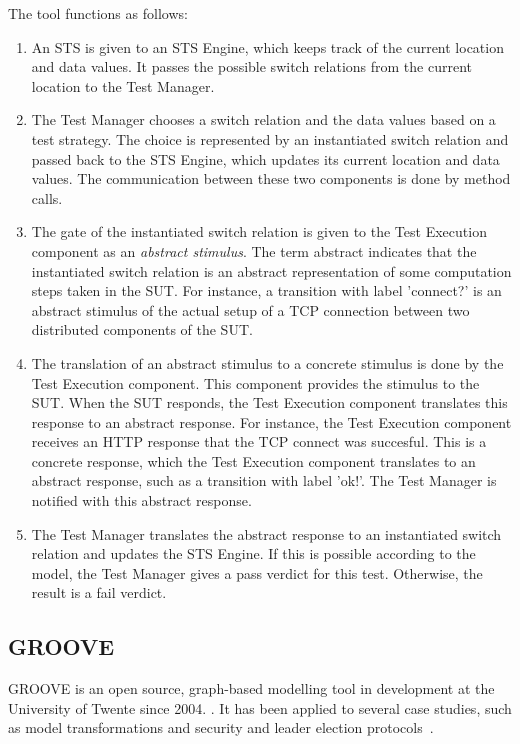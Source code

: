 The tool functions as follows: 
\begin{enumerate}
  \item An STS is given to an STS Engine, which keeps track of the current location and data values. It passes the possible switch relations from the current location to the Test Manager.
  \item The Test Manager chooses a switch relation and the data values based on a test strategy. The choice is represented by an instantiated switch relation and passed back to the STS Engine, which updates its current location and data values. The communication between these two components is done by method calls.
  \item The gate of the instantiated switch relation is given to the Test Execution component as an \textit{abstract stimulus}. The term abstract indicates that the instantiated switch relation is an abstract representation of some computation steps taken in the SUT. For instance, a transition with label 'connect?' is an abstract stimulus of the actual setup of a TCP connection between two distributed components of the SUT. 
  \item The translation of an abstract stimulus to a concrete stimulus is done by the Test Execution component. This component provides the stimulus to the SUT. When the SUT responds, the Test Execution component translates this response to an abstract response. For instance, the Test Execution component receives an HTTP response that the TCP connect was succesful. This is a concrete response, which the Test Execution component translates to an abstract response, such as a transition with label 'ok!'. The Test Manager is notified with this abstract response.
  \item The Test Manager translates the abstract response to an instantiated switch relation and updates the STS Engine. If this is possible according to the model, the Test Manager gives a pass verdict for this test. Otherwise, the result is a fail verdict.
\end{enumerate}

\subsection{GROOVE}\label{sec:descriptiongroove}
GROOVE is an open source, graph-based modelling tool in development at the University of Twente since 2004. \cite{Rensink2003a}. It has been applied to several case studies, such as model transformations and security and leader election protocols~\cite{Ghamarian:GROOVE}.

